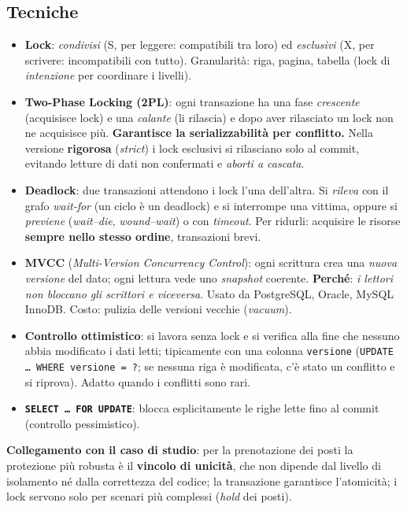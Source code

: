 \subsection{Tecniche}
\begin{itemize}
    \item \textbf{Lock}: \emph{condivisi} (S, per leggere: compatibili tra loro) ed \emph{esclusivi} (X, per scrivere: incompatibili con tutto). Granularità: riga, pagina, tabella (lock di \emph{intenzione} per coordinare i livelli).
    \item \textbf{Two-Phase Locking (2PL)}: ogni transazione ha una fase \emph{crescente} (acquisisce lock) e una \emph{calante} (li rilascia) e dopo aver rilasciato un lock non ne acquisisce più. \textbf{Garantisce la serializzabilità per conflitto.} Nella versione \textbf{rigorosa} (\emph{strict}) i lock esclusivi si rilasciano solo al commit, evitando letture di dati non confermati e \emph{aborti a cascata}.
    \item \textbf{Deadlock}: due transazioni attendono i lock l'una dell'altra. Si \emph{rileva} con il grafo \emph{wait-for} (un ciclo è un deadlock) e si interrompe una vittima, oppure si \emph{previene} (\emph{wait--die}, \emph{wound--wait}) o con \emph{timeout}. Per ridurli: acquisire le risorse \textbf{sempre nello stesso ordine}, transazioni brevi.
    \item \textbf{MVCC} (\emph{Multi-Version Concurrency Control}): ogni scrittura crea una \emph{nuova versione} del dato; ogni lettura vede uno \emph{snapshot} coerente. \textbf{Perché}: \emph{i lettori non bloccano gli scrittori e viceversa}. Usato da PostgreSQL, Oracle, MySQL InnoDB. Costo: pulizia delle versioni vecchie (\emph{vacuum}).
    \item \textbf{Controllo ottimistico}: si lavora senza lock e si verifica alla fine che nessuno abbia modificato i dati letti; tipicamente con una colonna \texttt{versione} (\texttt{UPDATE \ldots{} WHERE versione = ?}; se nessuna riga è modificata, c'è stato un conflitto e si riprova). Adatto quando i conflitti sono rari.
    \item \textbf{\texttt{SELECT \ldots{} FOR UPDATE}}: blocca esplicitamente le righe lette fino al commit (controllo pessimistico).
\end{itemize}
\textbf{Collegamento con il caso di studio}: per la prenotazione dei posti la protezione più robusta è il \textbf{vincolo di unicità}, che non dipende dal livello di isolamento né dalla correttezza del codice; la transazione garantisce l'atomicità; i lock servono solo per scenari più complessi (\emph{hold} dei posti).

